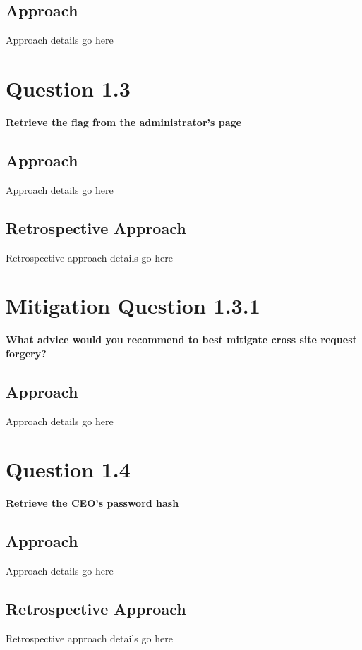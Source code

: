 \subsection{Approach}
Approach details go here

\section{Question 1.3}
\textbf{Retrieve the flag from the administrator's page}
\subsection{Approach}
Approach details go here
\subsection{Retrospective Approach}
Retrospective approach details go here

\section{Mitigation Question 1.3.1}
\textbf{What advice would you recommend to best mitigate cross site request
forgery?}
\subsection{Approach}
Approach details go here

\section{Question 1.4}
\textbf{Retrieve the CEO's password hash}
\subsection{Approach}
Approach details go here
\subsection{Retrospective Approach}
Retrospective approach details go here
